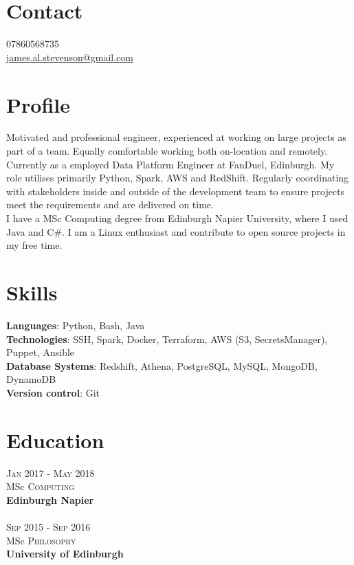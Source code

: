 \documentclass[14pt, a4paper]{extarticle}
\begin{document}
\par{\bigskip\par
\section{Contact}
\large
07860568735\\
\href{mailto:james.al.stevenson@gmail.com}{james.al.stevenson@gmail.com}\\
}

\begin{multicols}{2}

\section{Profile}
\noindent Motivated and professional engineer, experienced at working on large projects as part of a team. Equally comfortable working both on-location and remotely.\\
Currently as a employed Data Platform Engineer at FanDuel, Edinburgh. My role utilises primarily Python, Spark, AWS and RedShift. Regularly coordinating with stakeholders inside and outside of the development team to ensure projects meet the requirements and are delivered on time.\\
I have a MSc Computing degree from Edinburgh Napier University, where I used Java and C\#. I am a Linux enthusiast and contribute to open source projects in my free time.

\section{Skills}
\noindent\textbf{Languages}: Python, Bash, Java\\
\textbf{Technologies}: SSH, Spark, Docker, Terraform, AWS (S3, SecretsManager), Puppet, Ansible\\
\textbf{Database Systems}: Redshift, Athena, PostgreSQL, MySQL, MongoDB, DynamoDB\\
\textbf{Version control}: Git\\

\section{Education}
\noindent\textsc{Jan} 2017 - \textsc{May} 2018\\
MSc \textsc{Computing} \\
\textbf{Edinburgh Napier}\\~\\
\textsc{Sep} 2015 - \textsc{Sep} 2016\\
MSc \textsc{Philosophy} \\
\textbf{University of Edinburgh}


\end{multicols}
\end{document}
